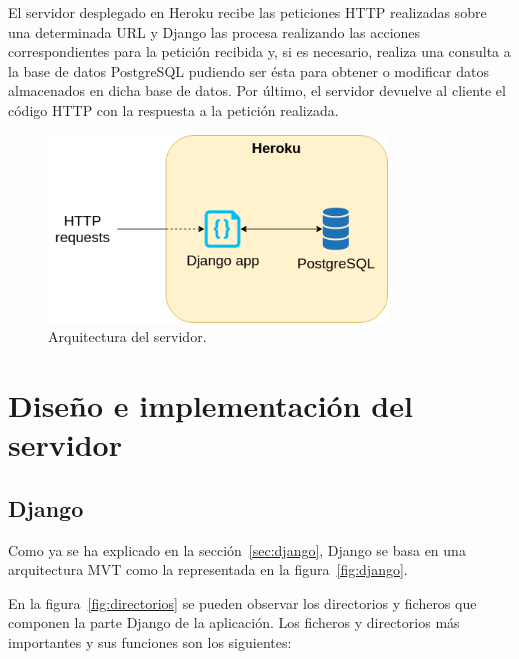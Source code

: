 \documentclass[a4paper, 12pt]{book}
\begin{document}
El servidor desplegado en Heroku recibe las peticiones HTTP realizadas sobre una determinada URL y Django las procesa realizando las acciones correspondientes para la petición recibida y, si es necesario, realiza una consulta a la base de datos PostgreSQL pudiendo ser ésta para obtener o modificar datos almacenados en dicha base de datos.
Por último, el servidor devuelve al cliente el código HTTP con la respuesta a la petición realizada.
\newline
\begin{figure}[h]
  \centering
  \includegraphics[width=9cm, keepaspectratio]{img/servidor.png}
  \caption{Arquitectura del servidor.}\label{fig:servidor}
\end{figure}

\section{Diseño e implementación del servidor} 
\label{sec:diseno_servidor}

\subsection{Django}
\label{subsec:diseño_django}

Como ya se ha explicado en la sección~\ref{sec:django}, Django se basa en una arquitectura MVT como la representada en la figura~\ref{fig:django}.

En la figura~\ref{fig:directorios} se pueden observar los directorios y ficheros que componen la parte Django de la aplicación. Los ficheros y directorios más importantes y sus funciones son los siguientes:
\end{document}
